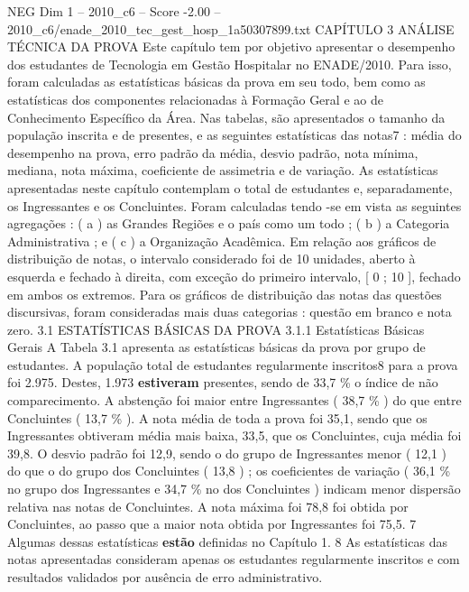 \begin{textsample}{NEG Dim 1 – 2010\_c6 – Score -2.00 – 2010\_c6/enade\_2010\_tec\_gest\_hosp\_1a50307899.txt}  \label{ex:f1_neg_278}
CAPÍTULO 3 ANÁLISE TÉCNICA DA PROVA Este capítulo tem por objetivo apresentar o desempenho dos estudantes de Tecnologia em Gestão Hospitalar no ENADE/2010.
Para isso, foram calculadas as estatísticas básicas da prova em seu todo, bem como as estatísticas dos componentes relacionadas à Formação Geral e ao de Conhecimento Específico da Área.
Nas tabelas, são apresentados o tamanho da população inscrita e de presentes, e as seguintes estatísticas das notas7 : média do desempenho na prova, erro padrão da média, desvio padrão, nota mínima, mediana, nota máxima, coeficiente de assimetria e de variação.
As estatísticas apresentadas neste capítulo contemplam o total de estudantes e, separadamente, os Ingressantes e os Concluintes.
Foram calculadas tendo -se em vista as seguintes agregações : ( a ) as Grandes Regiões e o país como um todo ; ( b ) a Categoria Administrativa ; e ( c ) a Organização Acadêmica.
Em relação aos gráficos de distribuição de notas, o intervalo considerado foi de 10 unidades, aberto à esquerda e fechado à direita, com exceção do primeiro intervalo, [ 0 ; 10 ], fechado em ambos os extremos.
Para os gráficos de distribuição das notas das questões discursivas, foram consideradas mais duas categorias : questão em branco e nota zero. 3.1 ESTATÍSTICAS BÁSICAS DA PROVA 3.1.1 Estatísticas Básicas Gerais A Tabela 3.1 apresenta as estatísticas básicas da prova por grupo de estudantes.
A população total de estudantes regularmente inscritos8 para a prova foi 2.975.
Destes, 1.973 \textbf{estiveram} presentes, sendo de 33,7 \% o índice de não comparecimento.
A abstenção foi maior entre Ingressantes ( 38,7 \% ) do que entre Concluintes ( 13,7 \% ).
A nota média de toda a prova foi 35,1, sendo que os Ingressantes obtiveram média mais baixa, 33,5, que os Concluintes, cuja média foi 39,8.
O desvio padrão foi 12,9, sendo o do grupo de Ingressantes menor ( 12,1 ) do que o do grupo dos Concluintes ( 13,8 ) ; os coeficientes de variação ( 36,1 \% no grupo dos Ingressantes e 34,7 \% no dos Concluintes ) indicam menor dispersão relativa nas notas de Concluintes.
A nota máxima foi 78,8 foi obtida por Concluintes, ao passo que a maior nota obtida por Ingressantes foi 75,5. 7 Algumas dessas estatísticas \textbf{estão} definidas no Capítulo 1. 8 As estatísticas das notas apresentadas consideram apenas os estudantes regularmente inscritos e com resultados validados por ausência de erro administrativo.

\end{textsample}
